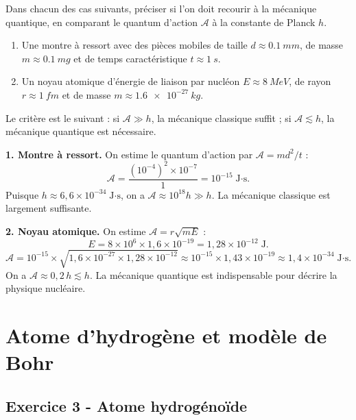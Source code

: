 \documentclass[12pt,a4paper]{article}
\begin{document}
\begin{boiteexercice}
Dans chacun des cas suivants, préciser si l'on doit recourir à la mécanique quantique, en
comparant le quantum d'action $\mathcal{A}$ à la constante de Planck $h$.
\begin{enumerate}
  \item Une montre à ressort avec des pièces mobiles de taille $d \approx \qty{0.1}{mm}$,
    de masse $m \approx \qty{0.1}{mg}$ et de temps caractéristique $t \approx \qty{1}{s}$.
  \item Un noyau atomique d'énergie de liaison par nucléon $E \approx \qty{8}{MeV}$,
    de rayon $r \approx \qty{1}{fm}$ et de masse $m \approx \qty{1.6e-27}{kg}$.
\end{enumerate}
\end{boiteexercice}

\begin{boitecorrige}
Le critère est le suivant : si $\mathcal{A} \gg h$, la mécanique classique suffit ; si
$\mathcal{A} \lesssim h$, la mécanique quantique est nécessaire.

\textbf{1. Montre à ressort.}
On estime le quantum d'action par $\mathcal{A} = md^2/t$ :
\[
  \mathcal{A} = \frac{(10^{-4})^2 \times 10^{-7}}{1} = 10^{-15}\;\text{J·s}.
\]
Puisque $h \approx 6{,}6\times10^{-34}\;\text{J·s}$, on a $\mathcal{A} \approx 10^{18}h \gg h$.
La mécanique classique est largement suffisante.

\textbf{2. Noyau atomique.}
On estime $\mathcal{A} = r\sqrt{mE}$ :
\[
  E = 8\times10^6 \times 1{,}6\times10^{-19} = 1{,}28\times10^{-12}\;\text{J}.
\]
\[
  \mathcal{A} = 10^{-15}\times\sqrt{1{,}6\times10^{-27}\times1{,}28\times10^{-12}}
              \approx 10^{-15}\times 1{,}43\times10^{-19} \approx 1{,}4\times10^{-34}\;\text{J·s}.
\]
On a $\mathcal{A} \approx 0{,}2\,h \lesssim h$. La mécanique quantique est indispensable pour
décrire la physique nucléaire.
\end{boitecorrige}

\newpage
\section{Atome d'hydrogène et modèle de Bohr}

\subsection*{Exercice 3 - Atome hydrogénoïde \niveau{\moyen}}
\end{document}

